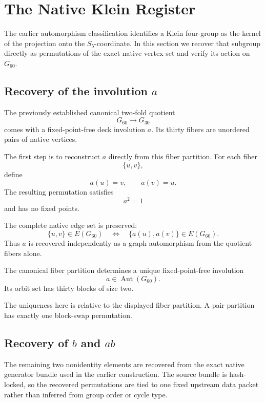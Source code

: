 \section{The Native Klein Register}

The earlier automorphism classification identifies a Klein four-group
as the kernel of the projection onto the \(S_5\)-coordinate. In this
section we recover that subgroup directly as permutations of the exact
native vertex set and verify its action on \(G_{60}\).

\subsection{Recovery of the involution \(a\)}

The previously established canonical two-fold quotient
\[
G_{60}\longrightarrow G_{30}
\]
comes with a fixed-point-free deck involution \(a\). Its thirty fibers
are unordered pairs of native vertices.

The first step is to reconstruct \(a\) directly from this fiber
partition. For each fiber
\[
\{u,v\},
\]
define
\[
a(u)=v,
\qquad
a(v)=u.
\]
The resulting permutation satisfies
\[
a^2=1
\]
and has no fixed points.

The complete native edge set is preserved:
\[
\{u,v\}\in E(G_{60})
\quad\Longleftrightarrow\quad
\{a(u),a(v)\}\in E(G_{60}).
\]
Thus \(a\) is recovered independently as a graph automorphism from the
quotient fibers alone.

\begin{proposition}
The canonical fiber partition determines a unique fixed-point-free
involution
\[
a\in\operatorname{Aut}(G_{60}).
\]
Its orbit set has thirty blocks of size two.
\end{proposition}

The uniqueness here is relative to the displayed fiber partition. A
pair partition has exactly one block-swap permutation.

\subsection{Recovery of \(b\) and \(ab\)}

The remaining two nonidentity elements are recovered from the exact
native generator bundle used in the earlier construction. The source
bundle is hash-locked, so the recovered permutations are tied to one
fixed upstream data packet rather than inferred from group order or
cycle type.

